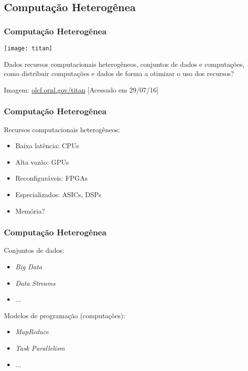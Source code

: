\documentclass[10pt, compress, aspectratio=43, xcolor={table,usenames,dvipsnames}]{beamer}
\begin{document}
\subsection{Computação Heterogênea}

\begin{frame}
    \frametitle{Computação Heterogênea}
    \begin{center}
        \texttt{[image: titan]}
    \end{center}


    Dados recursos computacionais \alert{heterogêneos}, conjuntos de
    \alert{dados} e \alert{computações}, como distribuir computações e dados de
    forma a \alert{otimizar o uso} dos recursos?
    \hfill

    \begin{center}
    \tiny{Imagem: \url{olcf.ornl.gov/titan} [Acessado em 29/07/16]}
    \end{center}
\end{frame}

\begin{frame}
    \frametitle{Computação Heterogênea}
    Recursos computacionais \alert{heterogêneos}:
    \begin{itemize}
        \item Baixa latência: CPUs
        \item Alta vazão: GPUs
        \item Reconfiguráveis: FPGAs
        \item Especializados: ASICs, DSPs
        \item Memória?
    \end{itemize}
\end{frame}

\begin{frame}
    \frametitle{Computação Heterogênea}
    Conjuntos de \alert{dados}:
    \begin{itemize}
        \item \textit{Big Data}
        \item \textit{Data Streams}
        \item ...
    \end{itemize}
    Modelos de programação (\alert{computações}):
    \begin{itemize}
        \item \textit{MapReduce}
        \item \textit{Task Parallelism}
        \item ...
    \end{itemize}
\end{frame}
\end{document}
